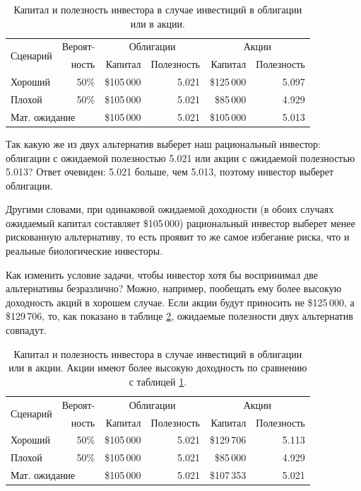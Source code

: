  \begin{table}[h!]
 \centering
 \begin{tabular}{l|r|r|r|r|r}
\multirow{2}{*}{Сценарий} & Вероят- & \multicolumn{2}{c|}{Облигации} & \multicolumn{2}{c}{Акции} \\
\cline{3-6}
        &  ность   & Капитал    & Полезность & Капитал      & Полезность \\ \hline
Хороший & 50\% & \$105\,000 & 5.021    & \$125\,000 & 5.097 \\
Плохой  & 50\% & \$105\,000 & 5.021    & \$85\,000  & 4.929 \\ \hline
\multicolumn{2}{l|}{Мат. ожидание}      & \$105\,000 & 5.021 & \$105\,000 & 5.013
\end{tabular}
\caption{Капитал и полезность инвестора в случае инвестиций в облигации или в акции.}
\label{logarithmic_utility_table}
 \end{table}
 
Так какую же из двух альтернатив выберет наш рациональный инвестор: облигации с ожидаемой полезностью 5.021 или акции с ожидаемой полезностью 5.013? Ответ очевиден: 5.021 больше, чем 5.013, поэтому инвестор выберет облигации.

Другими словами, при одинаковой ожидаемой доходности (в обоих случаях ожидаемый капитал составляет \$105\,000) рациональный инвестор выберет менее рискованную альтернативу, то есть проявит то же самое избегание риска, что и реальные биологические инвесторы.

Как изменить условие задачи, чтобы инвестор хотя бы воспринимал две альтернативы безразлично? Можно, например, пообещать ему более высокую доходность акций в хорошем случае. Если акции будут приносить не \$125\,000, а \$129\,706, то, как показано в таблице \ref{logarithmic_utility_table_premium}, ожидаемые полезности двух альтернатив совпадут.

 \begin{table}[h!]
 \centering
 \begin{tabular}{l|r|r|r|r|r}
\multirow{2}{*}{Сценарий} & Вероят- & \multicolumn{2}{c|}{Облигации} & \multicolumn{2}{c}{Акции} \\
\cline{3-6}
        &  ность   & Капитал    & Полезность & Капитал      & Полезность \\ \hline
Хороший & 50\% & \$105\,000 & 5.021    & \$129\,706 & 5.113 \\
Плохой  & 50\% & \$105\,000 & 5.021    & \$85\,000  & 4.929 \\ \hline
\multicolumn{2}{l|}{Мат. ожидание}      & \$105\,000 & 5.021 & \$107\,353 & 5.021
\end{tabular}
\caption{Капитал и полезность инвестора в случае инвестиций в облигации или в акции. Акции имеют более высокую доходность по сравнению с таблицей \ref{logarithmic_utility_table}.}
\label{logarithmic_utility_table_premium}
 \end{table}
 

